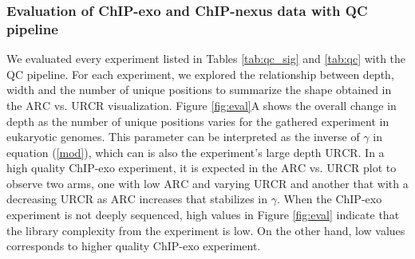 \documentclass{bmcart}\usepackage[]{graphicx}\usepackage[]{color}
\begin{document}


\subsubsection*{Evaluation of ChIP-exo and ChIP-nexus data with QC
  pipeline}

We evaluated every experiment listed in Tables \ref{tab:qc_sig} and
\ref{tab:qc} with the QC pipeline. For each experiment, we explored
the relationship between depth, width and the number of unique
positions to summarize the shape obtained in the $\mbox{ARC}$
vs. $\mbox{URCR}$ visualization. Figure \ref{fig:eval}A shows the
overall change in depth as the number of unique positions varies for
the gathered experiment in eukaryotic genomes. This parameter can be
interpreted as the inverse of $\gamma$ in equation (\ref{mod}), which
can is also the experiment's large depth $\mbox{URCR}$. In a high
quality ChIP-exo experiment, it is expected in the $\mbox{ARC}$
vs. $\mbox{URCR}$ plot to observe two arms, one with low $\mbox{ARC}$
and varying $\mbox{URCR}$ and another that with a decreasing
$\mbox{URCR}$ as $\mbox{ARC}$ increases that stabilizes in
$\gamma$. When the ChIP-exo experiment is not deeply sequenced, high
values in Figure \ref{fig:eval} indicate that the library complexity
from the experiment is low. On the other hand, low values corresponds
to higher quality ChIP-exo experiment.
\end{document}
